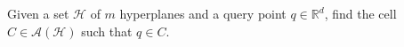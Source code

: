 \begin{problem}[name=Point Location,label=problem:point-location-hyperplane]
	Given a set \(\mathcal{H}\) of \(m\) hyperplanes and a query point
	\(q\in\mathbb{R}^d\),
	find the cell \(C \in \mathcal{A}(\mathcal{H})\) such that \(q \in C\).
\end{problem}
